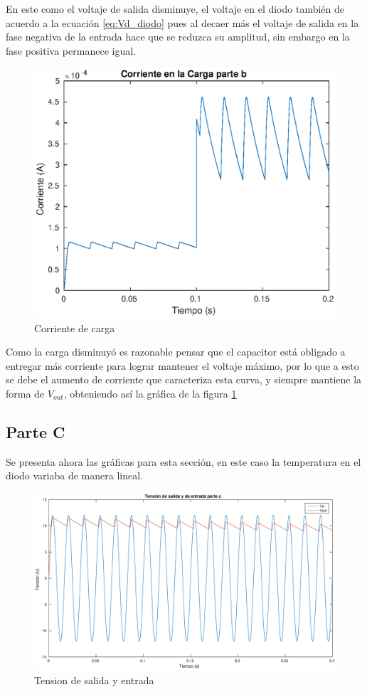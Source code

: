 \documentclass[12pt,letterpaper]{article}
\begin{document}
En este como el voltaje de salida disminuye, el voltaje en el diodo también de acuerdo a la ecuación \eqref{eq:Vd_diodo} pues al decaer más el voltaje de salida en la fase negativa de la entrada hace que se reduzca su amplitud, sin embargo en la fase positiva permanece igual.

\begin{figure}[ht!]
  \centering
  \includegraphics[width=0.8\linewidth]{pictures/Ejercicio2_b_carga.eps}
  \caption{Corriente de carga}
  \label{fig:2_b_carga}
\end{figure}

Como la carga disminuyó es razonable pensar que el capacitor está obligado a entregar más corriente para lograr mantener el voltaje máximo, por lo que a esto se debe el aumento de corriente que caracteriza esta curva, y siempre mantiene la forma de $V_{out}$, obteniendo así la gráfica de la figura \ref{fig:2_b_carga}


\subsection{Parte C}

Se presenta ahora las gráficas para esta sección, en este caso la temperatura en el diodo variaba de manera lineal.

\begin{figure}[ht!]
  \centering
  \includegraphics[width=0.8\linewidth]{pictures/Ejercicio2_c_Vin_Vout.eps}
  \caption{Tension de salida y entrada }
  \label{fig:2_c_Vin_Vout}
\end{figure}
\end{document}
